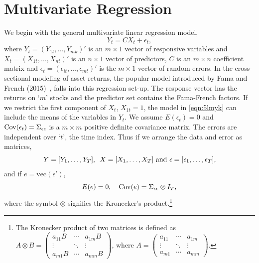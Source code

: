 \section{Multivariate Regression \label{s:s_mr}} 

We begin with the general multivariate linear regression model,
	\begin{equation} \label{eqn:5lmyk}
	Y_t = C X_t + \epsilon_t,
	\end{equation}
where $Y_t= (Y_{1t}, \ldots,Y_{mk})'$ is an $m \times 1$ vector of responsive variables and $X_t= (X_{1t}, \ldots, X_{nt})'$ is an $n \times 1$ vector of predictors, $C$ is an $m \times n$ coefficient matrix and $\epsilon_t= (\epsilon_{it}, \ldots, \epsilon_{mt})'$ is the $m \times 1$ vector of random errors. In the cross-sectional modeling of asset returns, the popular model introduced by Fama and French (2015)~\cite{fama2015}, falls into this regression set-up. The response vector has the returns on `$m$' stocks and the predictor set contains the Fama-French factors. If we restrict the first component of $X_t$, $X_{1t}= 1$, the model in \eqref{eqn:5lmyk} can include the means of the variables in $Y_t$. We assume $E(\epsilon_t)= 0$ and $\operatorname{Cov}(\epsilon_t)= \Sigma_{\epsilon \epsilon}$ is a $m \times m$ positive definite covariance matrix. The errors are independent over `$t$', the time index. Thus if we arrange the data and error as matrices,
	\begin{equation} \label{eqn:5yyt}
	Y= [Y_1,\ldots,Y_T], \enskip X=[X_1,\ldots,X_T] \text{ and } \epsilon= [\epsilon_1, \ldots,\epsilon_T],
	\end{equation}
and if $e=\text{vec}(\epsilon')$,
	\begin{equation} \label{eqn:5Ee0}
	E(e)=0, \quad \cov(e)= \Sigma_{\epsilon \epsilon} \otimes I_T,
	\end{equation}
where the symbol $\otimes$ signifies the Kronecker's product.\footnote{The Kronecker product of two matrices is defined as $A \otimes B= \begin{pmatrix} a_{11} B & \cdots & a_{1m} B \\ \vdots & \ddots & \vdots \\ a_{m1} B & \cdots & a_{mm}B \end{pmatrix}$, where $A= \begin{pmatrix} a_{11} & \cdots & a_{1m} \\ \vdots & \ddots & \vdots \\ a_{m1} & \cdots & a_{mm} \end{pmatrix}$.} 


